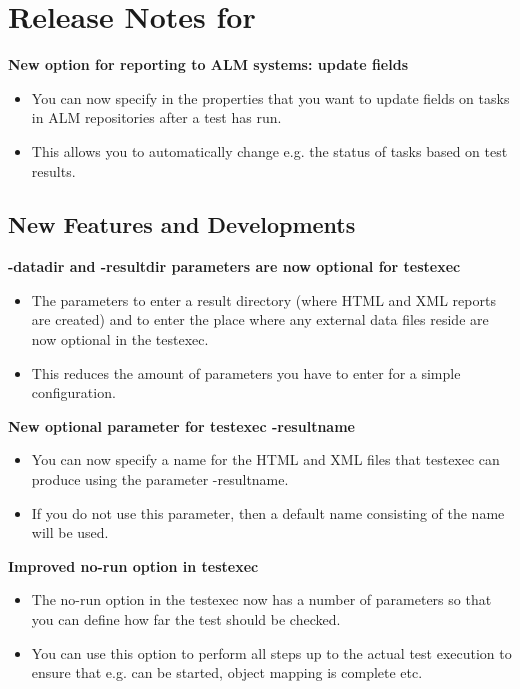 \makeatletter
\section{Release Notes for \@bxversion}
\makeatother

\textbf{New option for reporting to ALM systems: update fields}
\begin{itemize}
\item You can now specify in the \gdproject{} properties that you want to update fields on tasks in ALM repositories after a test has run.
\item This allows you to automatically change e.g. the status of tasks based on test results.
\end{itemize}

\subsection{New Features and Developments}
\textbf{-datadir and -resultdir parameters are now optional for testexec}
\begin{itemize}
\item The parameters to enter a result directory (where HTML and XML reports are created) and to enter the place where any external data files reside are now optional in the testexec.
\item This reduces the amount of parameters you have to enter for a simple configuration.
\end{itemize}

\textbf{New optional parameter for testexec -resultname}
\begin{itemize}
\item You can now specify a name for the HTML and XML files that testexec can produce using the parameter -resultname.
\item If you do not use this parameter, then a default name consisting of the \gdsuite{} name will be used.
\end{itemize}

\textbf{Improved no-run option in testexec}
\begin{itemize}
\item The no-run option in the testexec now has a number of parameters so that you can define how far the test should be checked. 
\item You can use this option to perform all steps up to the actual test execution to ensure that e.g. \gdauts{} can be started, object mapping is complete etc.
\end{itemize}

